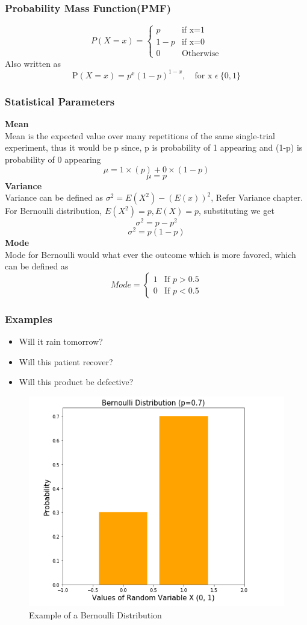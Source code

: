 \documentclass[12pt]{extarticle}
\begin{document}
\subsubsection{Probability Mass Function(PMF)}
$$
P(X=x) = 
\begin{cases}
    p & \text{if x=1} \\
    1-p & \text{if x=0} \\
    0 & \text{Otherwise}
\end{cases}
$$
Also written as 
$$ \mathrm{P}(X=x) = p^x(1-p)^{1-x}, \quad \text{for x }\epsilon \ \{0,1\}$$

\subsubsection{Statistical Parameters}
\textbf{Mean}\\
Mean is the expected value over many repetitions of the same single-trial experiment,
thus it would be p since, p is probability of 1 appearing and (1-p) is probability of 0 appearing
$$\mu = 1 \times (p)+0 \times (1-p)$$
$$\mu = p$$
\textbf{Variance}\\
Variance can be defined as \( \sigma^2 = E(X^2) - (E(x))^2\), Refer Variance chapter. 
For Bernoulli distribution, \(E(X^2) = p, E(X) = p\), substituting we get
$$\sigma^2 = p - p^2$$
$$\sigma^2 = p(1-p)$$
\textbf{Mode}\\
Mode for Bernoulli would what ever the outcome which is more favored, which can be defined as  
$$
Mode = 
\begin{cases}
    1 & \text{If \(p > 0.5 \)}  \\
    0 & \text{If \(p < 0.5\)}
\end{cases}
$$
\subsubsection{Examples}
\begin{itemize}
    \item Will it rain tomorrow?
    \item Will this patient recover?
    \item Will this product be defective?
\end{itemize}

\begin{figure}[H]
    \centering
    \includegraphics[width=0.5\linewidth]{images/bernoulli_example.png}
    \caption{Example of a Bernoulli Distribution}
    \label{fig:enter-label}
\end{figure}
\end{document}
